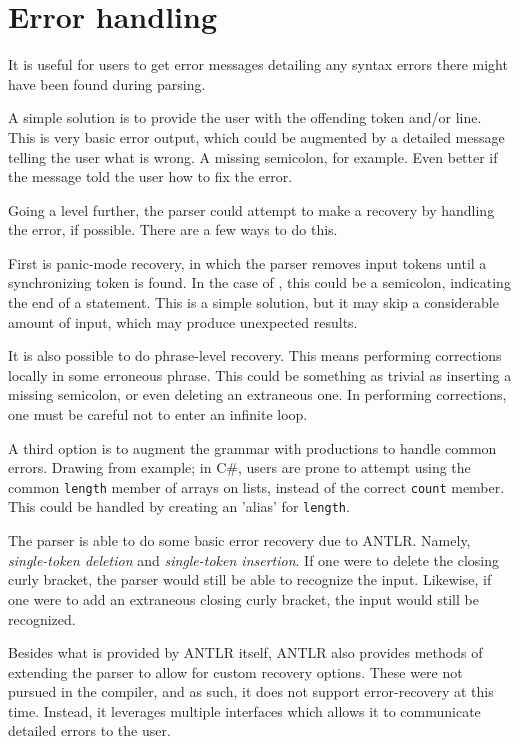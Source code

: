 \section{Error handling} \label{ErrorHandling}
It is useful for users to get error messages detailing any syntax errors there might have been found during parsing.

A simple solution is to provide the user with the offending token and/or line. This is very basic error output, which could be augmented by a detailed message telling the user what is wrong. A missing semicolon, for example. Even better if the message told the user how to fix the error. 

Going a level further, the parser could attempt to make a recovery by handling the error, if possible. There are a few ways to do this.

First is panic-mode recovery, in which the parser removes input tokens until a synchronizing token is found. In the case of \dazel{}, this could be a semicolon, indicating the end of a statement. This is a simple solution, but it may skip a considerable amount of input, which may produce unexpected results\cite{crafting_a_compiler}.

It is also possible to do phrase-level recovery. This means performing corrections locally in some erroneous phrase. This could be something as trivial as inserting a missing semicolon, or even deleting an extraneous one. In performing corrections, one must be careful not to enter an infinite loop\cite{spo_course}.

A third option is to augment the grammar with productions to handle common errors\cite{spo_course}. Drawing from example; in C\#, users are prone to attempt using the common \texttt{length} member of arrays on lists, instead of the correct \texttt{count} member. This could be handled by creating an 'alias' for \texttt{length}.

The \dazel{} parser is able to do some basic error recovery due to ANTLR. Namely, \textit{single-token deletion} and \textit{single-token insertion}. If one were to delete the closing curly bracket, the parser would still be able to recognize the input. Likewise, if one were to add an extraneous closing curly bracket, the input would still be recognized.

Besides what is provided by ANTLR itself, ANTLR also provides methods of extending the parser to allow for custom recovery options. These were not pursued in the \dazel{} compiler, and as such, it does not support error-recovery at this time. Instead, it leverages multiple interfaces which allows it to communicate detailed errors to the user.

